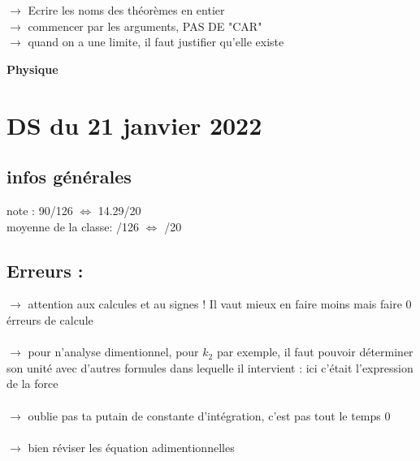 \documentclass{book}
\begin{document}
$\rightarrow$ Ecrire les noms des théorèmes en entier \\
$\rightarrow$ commencer par les arguments, PAS DE "CAR" \\
$\rightarrow$ quand on a une limite, il faut justifier qu'elle existe \\




\begin{center}
\textbf{\large Physique}
\end{center}

\vspace{0.6cm}

\section{DS du 21 janvier 2022}

\begin{tcolorbox}[width={14cm},colback={yellow!20!white},title={\textbf{Commentaire générale sur ce DS}},colbacktitle=red!40!white,coltitle=black]    

\end{tcolorbox}

\subsection{infos générales}

note : 90/126 $\Leftrightarrow$ 14.29/20 \\
moyenne de la classe: /126 $\Leftrightarrow$ /20

\subsection{Erreurs :}

$\rightarrow$ attention aux calcules et au signes ! Il vaut mieux en faire moins mais faire 0 érreurs de calcule \\ \\
$\rightarrow$ pour n'analyse dimentionnel, pour $k_2$ par exemple, il faut pouvoir déterminer son unité avec d'autres formules dans lequelle il intervient : ici c'était l'expression de la force \\ \\
$\rightarrow$ oublie pas ta putain de constante d'intégration, c'est pas tout le temps 0 \\ \\
$\rightarrow$ bien réviser les équation adimentionnelles \\ \\
\end{document}
